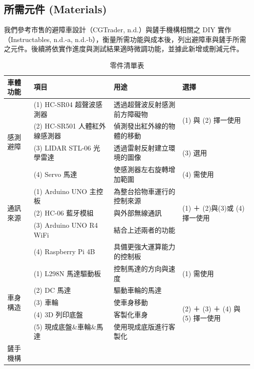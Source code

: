 \documentclass[12pt]{article}
\begin{document}
\subsection{所需元件 (Materials)}
我們參考市售的避障車設計（CGTrader, n.d.）與鏟手機構相關之 DIY 實作（Instructables, n.d.-a, n.d.-b），衡量所需功能與成本後，列出避障車與鏟手所需之元件。後續將依實作進度與測試結果適時微調功能，並據此新增或刪減元件。
\begin{table}[H]
    \centering
    \caption{零件清單表}
    \label{tab:materials}
    \scriptsize
    \setlength{\tabcolsep}{3pt}
    \renewcommand{\arraystretch}{0.95}
    \begin{tabularx}{\linewidth}{l X X X}
      \toprule
      車體功能 & 項目 & 用途 & 選擇 \\
      \midrule
      \multirow{4}{*}{感測避障}
        & (1) HC-SR04 超聲波感測器           & 透過超聲波反射感測前方障礙物 & \multirow{2}{=}{(1) 與 (2) 擇一使用} \\
        & (2) HC-SR501 人體紅外線感測器      & 偵測發出紅外線的物體的移動 & \\
        & (3) LIDAR STL-06 光學雷達      & 透過雷射反射建立環境的圖像 & (3) 選用\\ 
        & (4) Servo 馬達                   & 使感測器左右旋轉增加範圍 & (4) 需使用 \\
      \midrule
      \multirow{3}{*}{通訊來源}
        & (1) Arduino UNO 主控板              & 為整台拾物車運行的控制來源 & \multirow{3}{=}{(1) ＋ (2)與(3)或 (4) 擇一使用} \\
        & (2) HC-06 藍牙模組                  & 與外部無線通訊 & \\
        & (3) Arduino UNO R4 WiFi            & 結合上述兩者的功能 & \\
        & (4) Raspberry Pi 4B               & 具備更強大運算能力的控制板 & \\
      \midrule
      \multirow{5}{*}{車身構造}
        & (1) L298N 馬達驅動板                & 控制馬達的方向與速度 & (1) 需使用\\
        & (2) DC 馬達                         & 驅動車輪的馬達 & \multirow{4}{=}{(2) ＋ (3) ＋ (4) 與 (5) 擇一使用}   \\
        & (3) 車輪                            & 使車身移動 & \\
        & (4) 3D 列印底盤                      & 客製化車身 & \\
        & (5) 現成底盤\&車輪\&馬達              & 使用現成底版進行客製化 & \\
      \midrule
      \multirow{4}{*}{鏟手機構} 

\end{tabularx}
\end{table}
\end{document}
